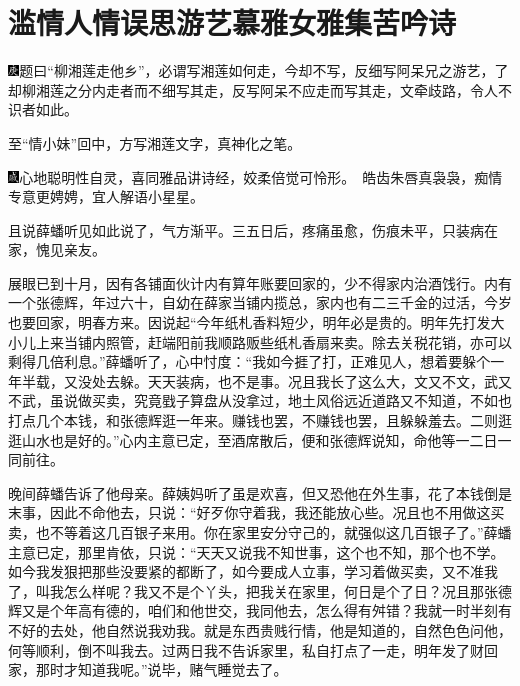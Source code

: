 

\chapter{滥情人情误思游艺\hspace{.5em}慕雅女雅集苦吟诗}
{\includegraphics[width=3mm]{../Images/00004}题曰``柳湘莲走他乡''，必谓写湘莲如何走，今却不写，反细写阿呆兄之游艺，了却柳湘莲之分内走者而不细写其走，反写阿呆不应走而写其走，文牵歧路，令人不识者如此。}

{至``情小妹''回中，方写湘莲文字，真神化之笔。}

{\includegraphics[width=3mm]{../Images/00005}心地聪明性自灵，喜同雅品讲诗经，姣柔倍觉可怜形。　皓齿朱唇真袅袅，痴情专意更娉娉，宜人解语小星星。}

且说薛蟠听见如此说了，气方渐平。三五日后，疼痛虽愈，伤痕未平，只装病在家，愧见亲友。

展眼已到十月，因有各铺面伙计内有算年账要回家的，少不得家内治酒饯行。内有一个张德辉，年过六十，自幼在薛家当铺内揽总，家内也有二三千金的过活，今岁也要回家，明春方来。因说起``今年纸札香料短少，明年必是贵的。明年先打发大小儿上来当铺内照管，赶端阳前我顺路贩些纸札香扇来卖。除去关税花销，亦可以剩得几倍利息。''薛蟠听了，心中忖度：``我如今捱了打，正难见人，想着要躲个一年半载，又没处去躲。天天装病，也不是事。况且我长了这么大，文又不文，武又不武，虽说做买卖，究竟戥子算盘从没拿过，地土风俗远近道路又不知道，不如也打点几个本钱，和张德辉逛一年来。赚钱也罢，不赚钱也罢，且躲躲羞去。二则逛逛山水也是好的。''心内主意已定，至酒席散后，便和张德辉说知，命他等一二日一同前往。

晚间薛蟠告诉了他母亲。薛姨妈听了虽是欢喜，但又恐他在外生事，花了本钱倒是末事，因此不命他去，只说：``好歹你守着我，我还能放心些。况且也不用做这买卖，也不等着这几百银子来用。你在家里安分守己的，就强似这几百银子了。''薛蟠主意已定，那里肯依，只说：``天天又说我不知世事，这个也不知，那个也不学。如今我发狠把那些没要紧的都断了，如今要成人立事，学习着做买卖，又不准我了，叫我怎么样呢？我又不是个丫头，把我关在家里，何日是个了日？况且那张德辉又是个年高有德的，咱们和他世交，我同他去，怎么得有舛错？我就一时半刻有不好的去处，他自然说我劝我。就是东西贵贱行情，他是知道的，自然色色问他，何等顺利，倒不叫我去。过两日我不告诉家里，私自打点了一走，明年发了财回家，那时才知道我呢。''说毕，赌气睡觉去了。

